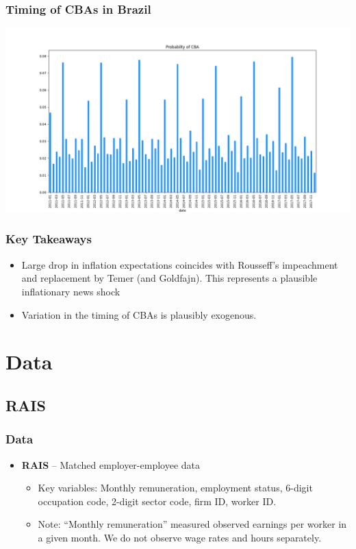 \documentclass[aspectratio=169]{beamer}
\begin{document}
			\begin{frame}
				\frametitle{Timing of CBAs in Brazil}
				\centering
				\includegraphics[scale=.35]{tables-figures/cba_probability.png}
			\end{frame}

	\begin{frame}
		\frametitle{Key Takeaways}
		\begin{itemize}
			\item Large drop in inflation expectations coincides with Rousseff's impeachment and  replacement by Temer (and Goldfajn). This represents a plausible inflationary news shock
			\item Variation in the timing of CBAs is plausibly exogenous. 
		\end{itemize}
	\end{frame}

	\section{Data}
		\subsection{RAIS}
		\begin{frame}
			\frametitle{Data}
			\begin{itemize}
				\item \textbf{RAIS} \--- Matched employer-employee data 
				\begin{itemize}
					\item Key variables: Monthly remuneration, employment status, 6-digit occupation code, 2-digit sector code, firm ID, worker ID.
					\item Note: ``Monthly remuneration'' measured observed earnings per worker in a given month. We do not observe wage rates and hours separately.
				\end{itemize}
			\end{itemize}
		\end{frame}
\end{document}
